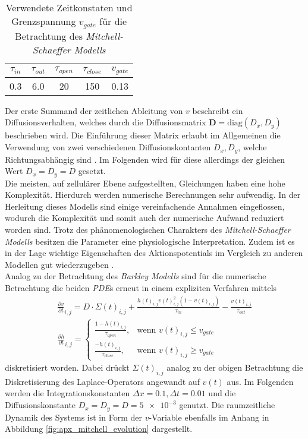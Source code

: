 \begin{table}[H]
\centering
\begin{tabular}{|c|c|c|c|c|}
$\tau_{in}$ & $\tau_{out}$ & $\tau_{open}$ & $\tau_{close}$ & $v_{gate}$ \\ 
\hline 
\hline 
0.3 & 6.0 & 20 & 150 & 0.13 \\ 
\hline 
\end{tabular} 
\caption{Verwendete Zeitkonstaten und Grenzspannung $v_{gate}$ für die Betrachtung des \textit{Mitchell-Schaeffer Modells}}
\label{tab:ms_parameters}
\end{table}

Der erste Summand der zeitlichen Ableitung von $v$ beschreibt ein Diffusionsverhalten, welches durch die Diffusionsmatrix $\mathbf{D} = \text{diag}(D_x, D_y)$ beschrieben wird. Die Einführung dieser Matrix erlaubt im Allgemeinen die Verwendung von zwei verschiedenen Diffusionskontanten $D_x, D_y$, welche Richtungsabhängig sind \citep{talbot2013towards}. Im Folgenden wird für diese allerdings der gleichen Wert $D_x = D_y = D$ gesetzt.\\

Die meisten, auf zellulärer Ebene aufgestellten, Gleichungen haben eine hohe Komplexität. Hierdurch werden numerische Berechnungen sehr aufwendig. In der Herleitung dieses Modells sind einige vereinfachende Annahmen eingeflossen, wodurch die Komplexität und somit auch der numerische Aufwand reduziert worden sind. Trotz des phänomenologischen Charakters des \textit{Mitchell-Schaeffer Modells} besitzen die Parameter eine physiologische Interpretation. Zudem ist es in der Lage wichtige Eigenschaften des Aktionspotentials im Vergleich zu anderen Modellen gut wiederzugeben \citep{talbot2013towards}.\\

Analog zu der Betrachtung des \textit{Barkley Modells} sind für die numerische Betrachtung die beiden \textit{PDE}s erneut in einem expliziten Verfahren mittels
\begin{equation}
\begin{gathered}
\frac{\partial v}{\partial t}_{i,j} = D \cdot \Sigma(t)_{i,j} + \frac{h(t)_{i,j} v(t)_{i,j}^2(1-v(t)_{i,j})}{\tau_{in}} - \frac{v(t)_{i,j}}{\tau_{out}}\\
\frac{\partial h}{\partial t}_{i,j} = \begin{cases}
	\frac{1-h(t)_{i,j}}{\tau_{open}},& \text{wenn } v(t)_{i,j} \leq v_{gate}\\
    \frac{-h(t)_{i,j}}{\tau_{close}},& \text{wenn } v(t)_{i,j} \geq v_{gate}
\end{cases}
\end{gathered}
\end{equation}
diskretisiert worden. Dabei drückt $\Sigma(t)_{i, j}$ analog zu der obigen Betrachtung die Diskretisierung des Laplace-Operators angewandt auf $v(t)$ aus. Im Folgenden werden die Integrationskonstanten $\Delta x = 0.1, \Delta t = 0.01$ und die Diffusionskonstante $D_x = D_y = D = \num{5e-3}$ genutzt. Die raumzeitliche Dynamik des Systems ist in Form der $v$-Variable ebenfalls im Anhang in Abbildung \ref{fig:apx_mitchell_evolution} dargestellt.\\